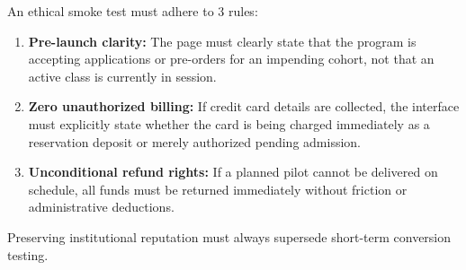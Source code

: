 An ethical smoke test must adhere to 3 rules:
\begin{enumerate}
    \item \textbf{Pre-launch clarity:} The page must clearly state that the program is accepting applications or pre-orders for an impending cohort, not that an active class is currently in session.
    \item \textbf{Zero unauthorized billing:} If credit card details are collected, the interface must explicitly state whether the card is being charged immediately as a reservation deposit or merely authorized pending admission.
    \item \textbf{Unconditional refund rights:} If a planned pilot cannot be delivered on schedule, all funds must be returned immediately without friction or administrative deductions.
\end{enumerate}

Preserving institutional reputation must always supersede short-term conversion testing.
